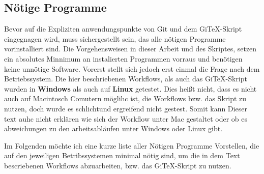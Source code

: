 \documentclass[12pt,a4paper]{scrartcl}
\begin{document}
\subsection{Nötige Programme}
Bevor auf die Expliziten anwendungspunkte von Git und dem GiTeX-Skript eingegnagen wird, muss sichergestellt sein, das alle nötigen Programme vorinstalliert sind. Die Vorgehensweisen in dieser Arbeit und des Skriptes, setzen ein absolutes Minnimum an instalierten Programmen vorraus und benötigen keine unnötige Software. Vorerst stellt sich jedoch erst einmal die Frage nach dem Betriebssystem. Die hier beschriebenen Workflows, als auch das GiTeX-Skript wurden in \textbf{Windows} als auch auf \textbf{Linux} getestet. Dies heißt nicht, dass es nicht auch auf Macintosch Comutern möglihc ist, die Workflows bzw. das Skript zu nutzen, doch wurde es schlichtund ergreifend nicht gestest. Somit kann Dieser text auhc nicht erklären wie sich der Workflow unter Mac gestaltet oder ob es abweichungen zu den arbeitsabläufen unter Windows oder Linux gibt.

Im Folgenden möchte ich eine kurze liste aller Nötigen Programme Vorstellen, die auf den jeweiligen Betribssystemen minimal nötig sind, um die in dem Text bescriebenen Workflows abzuarbeiten, bzw. das GiTeX-Skript zu nutzen.
\end{document}
